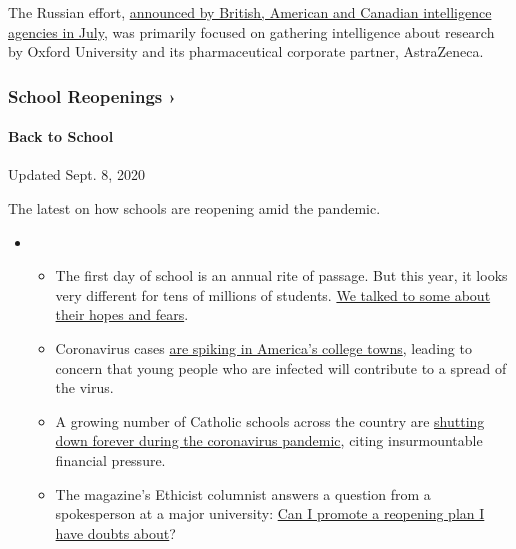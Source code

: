 The Russian effort,
\href{https://www.nytimes3xbfgragh.onion/2020/07/16/us/politics/vaccine-hacking-russia.html}{announced
by British, American and Canadian intelligence agencies in July}, was
primarily focused on gathering intelligence about research by Oxford
University and its pharmaceutical corporate partner, AstraZeneca.

\href{https://www.nytimes3xbfgragh.onion/spotlight/schools-reopening?action=click\&pgtype=Article\&state=default\&region=MAIN_CONTENT_3\&context=storylines_keepup}{}

\hypertarget{school-reopenings-}{%
\subsubsection{School Reopenings ›}\label{school-reopenings-}}

\hypertarget{back-to-school}{%
\paragraph{Back to School}\label{back-to-school}}

Updated Sept. 8, 2020

The latest on how schools are reopening amid the pandemic.

\begin{itemize}
\item
  \begin{itemize}
  \tightlist
  \item
    The first day of school is an annual rite of passage. But this year,
    it looks very different for tens of millions of students.
    \href{https://www.nytimes3xbfgragh.onion/2020/09/05/us/virtual-return-to-school-covid.html?action=click\&pgtype=Article\&state=default\&region=MAIN_CONTENT_3\&context=storylines_keepup}{We
    talked to some about their hopes and fears}.
  \item
    Coronavirus cases
    \href{https://www.nytimes3xbfgragh.onion/2020/09/06/us/colleges-coronavirus-students.html?action=click\&pgtype=Article\&state=default\&region=MAIN_CONTENT_3\&context=storylines_keepup}{are
    spiking in America's college towns}, leading to concern that young
    people who are infected will contribute to a spread of the virus.
  \item
    A growing number of Catholic schools across the country are
    \href{https://www.nytimes3xbfgragh.onion/2020/09/05/us/catholic-school-closings.html?action=click\&pgtype=Article\&state=default\&region=MAIN_CONTENT_3\&context=storylines_keepup}{shutting
    down forever during the coronavirus pandemic}, citing insurmountable
    financial pressure.
  \item
    The magazine's Ethicist columnist answers a question from a
    spokesperson at a major university:
    \href{https://www.nytimes3xbfgragh.onion/2020/09/08/magazine/university-reopening-safety-ethics.html?action=click\&pgtype=Article\&state=default\&region=MAIN_CONTENT_3\&context=storylines_keepup}{Can
    I promote a reopening plan I have doubts about}?
  \end{itemize}
\end{itemize}

